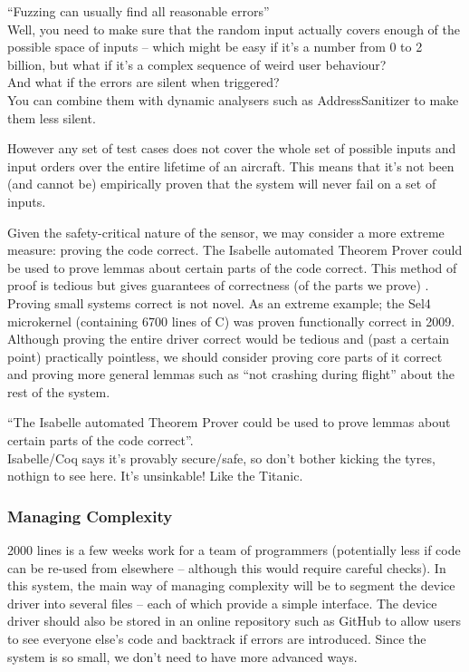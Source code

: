 \documentclass[10pt,\jkfside,a4paper]{article}
\begin{document}
\begin{enumerate}
\begin{enumerate}[label=(\alph*)]
{\color{blue}
``Fuzzing can usually find all reasonable errors''\\
Well, you need to make sure that the random input actually covers enough of the
possible space of inputs -- which might be easy if it's a number from 0 to 2 billion,
but what if it's a complex sequence of weird user behaviour?\\
And what if the errors are silent when triggered?\\
You can combine them with dynamic analysers such as AddressSanitizer to make them less silent.
}

However any set of test cases does not cover the whole set of possible inputs and input orders over the entire
lifetime of an aircraft.
This means that it's not been (and cannot be) empirically proven that the system will never fail on a
set of inputs.

Given the safety-critical nature of the sensor, we may consider a more extreme measure: proving the code correct.
The Isabelle automated Theorem Prover could be used to prove lemmas about certain parts of the code correct.
This method of proof is tedious but gives guarantees of correctness (of the parts we prove) .
Proving small systems correct is not novel.
As an extreme example; the Sel4 microkernel (containing 6700 lines of C) was proven functionally correct in 2009.
Although proving the entire driver correct would be tedious and (past a certain point) practically pointless,
we should consider proving core parts of it correct and proving more general lemmas such as ``not crashing during
flight'' about the rest of the system.

{\color{blue}
``The Isabelle automated Theorem Prover could be used to prove lemmas about certain
parts of the code correct''.\\
Isabelle/Coq says it's provably secure/safe, so don't bother kicking the tyres, nothign to see here.
It's unsinkable! Like the Titanic.
}

\subsubsection*{Managing Complexity}

2000 lines is a few weeks work for a team of programmers (potentially less if code can
be re-used from elsewhere -- although this would require careful checks).
In this system, the main way of managing complexity will be to segment the device driver into
several files -- each of which provide a simple interface. The device driver should also be stored in an online
repository such as GitHub to allow users to see everyone else's code and backtrack if errors are introduced.
Since the system is so small, we don't need to have more advanced ways.


\end{enumerate}
\end{enumerate}
\end{document}
